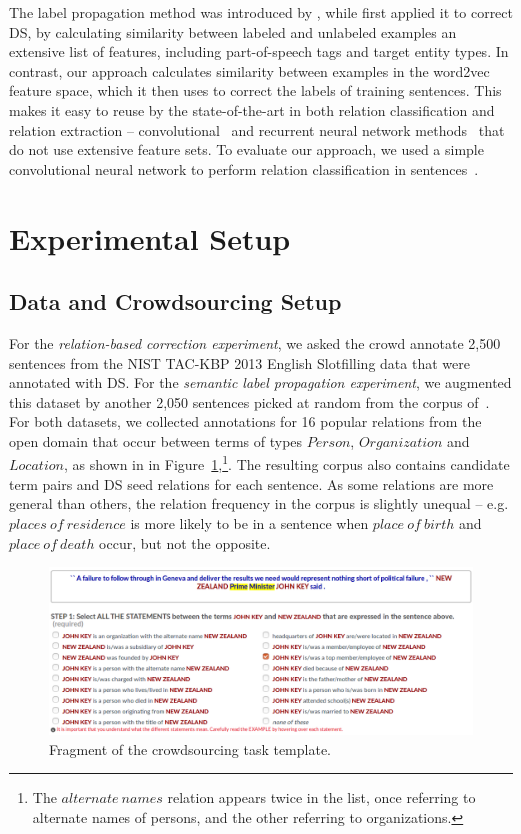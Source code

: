 The label propagation method was introduced by \citet{xiaojin2002learning}, while \citet{Chen:2006:REU:1220175.1220192} first applied it to correct DS, by calculating similarity between labeled and unlabeled examples an extensive list of features, including part-of-speech tags and target entity types. In contrast, our approach calculates similarity between examples in the word2vec~\cite{mikolov2013distributed} feature space, which it then uses to correct the labels of training sentences. This makes it easy to reuse by the state-of-the-art in both relation classification and relation extraction -- convolutional~\cite{ji2017distant} and recurrent neural network methods~\cite{zhou2016attention} that do not use extensive feature sets. To evaluate our approach, we used a simple convolutional neural network to perform relation classification in sentences~\cite{nguyen2015relation}.


\section{Experimental Setup}

\subsection{Data and Crowdsourcing Setup}

For the \textit{relation-based correction experiment}, we asked the crowd annotate 2,500 sentences from the NIST TAC-KBP 2013 English Slotfilling data that were annotated with DS. For the \textit{semantic label propagation experiment}, we augmented this dataset by another 2,050 sentences picked at random from the corpus of~\citet{angeli2014combining}. For both datasets, we collected annotations for 16 popular relations from the open domain that occur between terms of types $Person$, $Organization$ and $Location$, as shown in in Figure~\ref{fig:template},\footnote{The $alternate\ names$ relation appears twice in the list, once referring to alternate names of persons, and the other referring to organizations.}. The resulting corpus also contains candidate term pairs and DS seed relations for each sentence. As some relations are more general than others, the relation frequency in the corpus is slightly unequal -- e.g. $places\ of\ residence$ is more likely to be in a sentence when $place\ of\ birth$ and $place\ of\ death$ occur, but not the opposite.

\begin{figure}[htb!]
\centering
\includegraphics[width=\textwidth]{img/odrelex.png}
\caption{Fragment of the crowdsourcing task template.}
\label{fig:template}
\end{figure}

